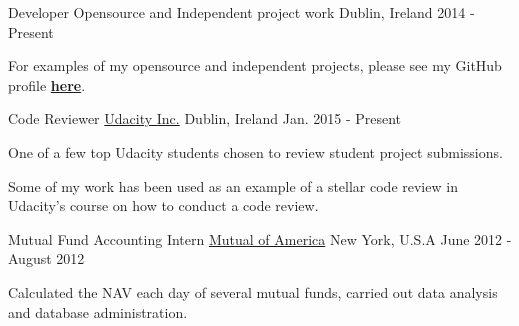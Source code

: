 \begin{cventries}
  \cventry
    {Developer}
    {Opensource and Independent project work}
    {Dublin, Ireland}
    {2014 - Present}
    {
      \begin{cvitems}
        \item {For examples of my opensource and independent projects, please see my GitHub profile \href{https://github.com/xkal36}{\textcolor{awesome-skyblue}{\textbf{here}}}}.
        \end{cvitems}
    }
  
  
  \cventry
    {Code Reviewer}
    {\href{https://www.udacity.com/}{Udacity Inc.}}
    {Dublin, Ireland}
    {Jan. 2015 - Present}
    {
      \begin{cvitems}
        \item {One of a few top Udacity students chosen to review student project submissions.}
        \item {Some of my work has been used as an example of a stellar code review in Udacity's course on how to conduct a code review.}
      \end{cvitems}
    }
  \cventry
    {Mutual Fund Accounting Intern}
    {\href{https://www.mutualofamerica.com/}{Mutual of America}}
    {New York, U.S.A}
    {June 2012 - August 2012}
    {
      \begin{cvitems}
        \item {Calculated the NAV each day of several mutual funds, carried out data analysis and database administration.}
      \end{cvitems}
    }
    
  
 
\end{cventries}


